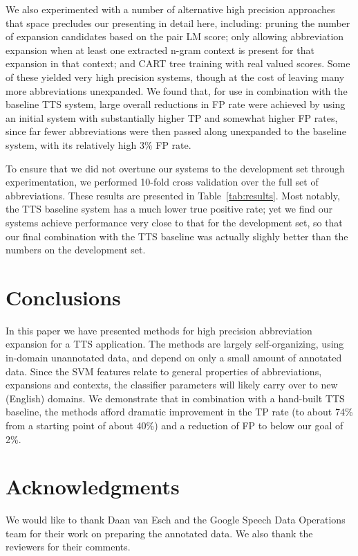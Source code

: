 \documentclass[11pt]{article}
\begin{document}
We also experimented with a number of alternative high precision approaches that
space precludes our presenting in detail here, including: pruning the number of
expansion candidates based on the pair LM score; only allowing abbreviation
expansion when at least one extracted n-gram context is present for that
expansion in that context; and CART tree \cite{Breiman:EtAl:84} training with
real valued scores.  Some of these yielded very high precision systems, though
at the cost of leaving many more abbreviations unexpanded.  We found that, for
use in combination with the baseline TTS system, large overall reductions in FP
rate were achieved by using an initial system with substantially higher TP and
somewhat higher FP rates, since far fewer abbreviations were then passed along
unexpanded to the baseline system, with its relatively high 3\% FP rate.

To ensure that we did not overtune our systems to the
development set through experimentation, we performed 10-fold cross validation over the full
set of abbreviations. These results are presented in
Table~\ref{tab:results}. Most notably, the TTS baseline system has a
much lower true positive rate; yet we find our systems achieve
performance very close to that for the development set, so that our
final combination with the TTS baseline was actually slighly better
than the numbers on the development set.

\vspace{-0.2cm}
\section{Conclusions}
\vspace{-0.2cm}
In this paper we have presented methods for high precision abbreviation
expansion for a TTS application.  The methods are largely self-organizing, using
in-domain unannotated data, and depend on only a small amount of annotated
data. Since the SVM features relate to general properties of
abbreviations, expansions and contexts, the classifier parameters will likely
carry over to new (English) domains. We demonstrate that in combination with a
hand-built TTS baseline, the methods afford dramatic improvement in the TP rate
(to about 74\% from a starting point of about 40\%) and a
reduction of FP to below our goal of 2\%.

\vspace{-0.2cm}
\section*{Acknowledgments}
\vspace{-0.2cm}
We would like to thank Daan van Esch and the Google Speech Data Operations team 
for their work on preparing the annotated data. We also
thank the reviewers for their comments.



\end{document}
